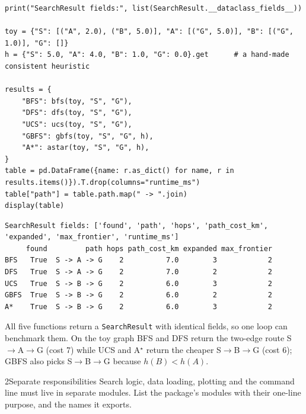 \begin{labanswer}
\begin{lstlisting}[style=utppython]
print("SearchResult fields:", list(SearchResult.__dataclass_fields__))

toy = {"S": [("A", 2.0), ("B", 5.0)], "A": [("G", 5.0)], "B": [("G", 1.0)], "G": []}
h = {"S": 5.0, "A": 4.0, "B": 1.0, "G": 0.0}.get      # a hand-made consistent heuristic

results = {
    "BFS": bfs(toy, "S", "G"),
    "DFS": dfs(toy, "S", "G"),
    "UCS": ucs(toy, "S", "G"),
    "GBFS": gbfs(toy, "S", "G", h),
    "A*": astar(toy, "S", "G", h),
}
table = pd.DataFrame({name: r.as_dict() for name, r in results.items()}).T.drop(columns="runtime_ms")
table["path"] = table.path.map(" -> ".join)
display(table)
\end{lstlisting}
\expectedoutput
\begin{lstlisting}[style=utpterminal]
SearchResult fields: ['found', 'path', 'hops', 'path_cost_km', 'expanded', 'max_frontier', 'runtime_ms']
     found         path hops path_cost_km expanded max_frontier
BFS   True  S -> A -> G    2          7.0        3            2
DFS   True  S -> A -> G    2          7.0        2            2
UCS   True  S -> B -> G    2          6.0        3            2
GBFS  True  S -> B -> G    2          6.0        2            2
A*    True  S -> B -> G    2          6.0        3            2
\end{lstlisting}
All five functions return a \texttt{SearchResult} with identical fields, so one loop can benchmark them. On the toy graph BFS and DFS return the two-edge route S$\to$A$\to$G (cost 7) while UCS and A$^\star$ return the cheaper S$\to$B$\to$G (cost 6); GBFS also picks S$\to$B$\to$G because $h(B)<h(A)$.
\end{labanswer}

\begin{labquestion}{2}{Separate responsibilities}
Search logic, data loading, plotting and the command line must live in separate modules. List the package's modules with their one-line purpose, and the names it exports.
\end{labquestion}

